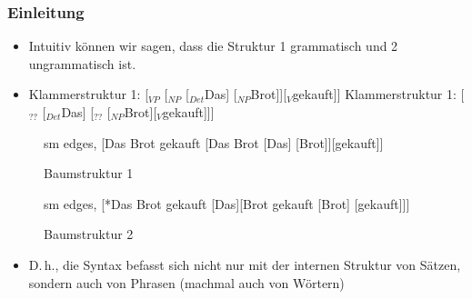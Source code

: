 \begin{frame}
\frametitle{Einleitung}

\begin{itemize}

	\item Intuitiv können wir sagen, dass die Struktur 1 grammatisch und 2 ungrammatisch ist.
	\item[]
	\eal
	\ex Klammerstruktur 1: [$_{VP}$ [$_{NP}$ [$_{Det}$Das] [$_{NP}$Brot]][$_{V}$gekauft]]
	\ex Klammerstruktur 1: [$_{??}$ [$_{Det}$Das] [$_{??}$ [$_{NP}$Brot][$_{V}$gekauft]]]
	\zl

\end{itemize}


\begin{figure}[b]
	\begin{minipage}[b]{0.05\textwidth}
	\end{minipage} 
	\begin{minipage}[b]{0.40\textwidth}
	\centering
	\scriptsize{
		\begin{forest}
		sm edges,
		[Das Brot gekauft [Das Brot [Das] [Brot]][gekauft]]
		\end{forest}
		}
		\caption{Baumstruktur 1}	
  	\end{minipage}  
	\begin{minipage}[b]{0.05\textwidth}
  	\end{minipage}
  	\begin{minipage}[b]{0.40\textwidth}
	\centering
	\scriptsize{
		\begin{forest}
		sm edges,
		[*Das Brot gekauft [Das][Brot gekauft [Brot] [gekauft]]]
		\end{forest}
		}
		\caption{Baumstruktur 2}
  	\end{minipage}  
	\begin{minipage}[b]{0.05\textwidth}
  	\end{minipage}
  	
\end{figure}

\begin{itemize}
	\item D.\,h., die Syntax befasst sich nicht nur mit der internen Struktur von Sätzen, sondern auch von Phrasen (machmal auch von Wörtern)
\end{itemize}
\end{frame}


